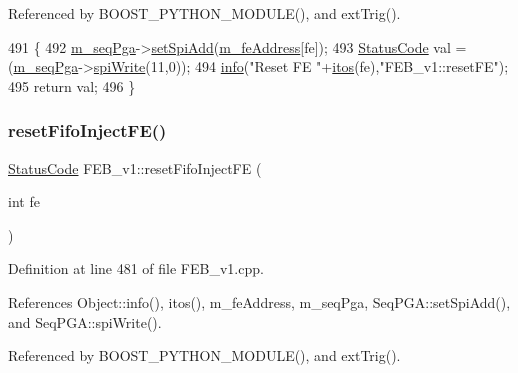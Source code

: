 Referenced by B\+O\+O\+S\+T\+\_\+\+P\+Y\+T\+H\+O\+N\+\_\+\+M\+O\+D\+U\+L\+E(), and ext\+Trig().


\begin{DoxyCode}
491                                 \{  
492   \hyperlink{classFEB__v1_a6c7804ac86796f233a8393043adf2e77}{m\_seqPga}->\hyperlink{classSeqPGA_ac998ce3a6d9b5f2e88cc8393f8c1df53}{setSpiAdd}(\hyperlink{classFEB__v1_a4e1945c2d5b434125f375e9d0fc6d99f}{m\_feAddress}[fe]);
493   \hyperlink{classStatusCode}{StatusCode} val = (\hyperlink{classFEB__v1_a6c7804ac86796f233a8393043adf2e77}{m\_seqPga}->\hyperlink{classSeqPGA_ad4421841ce4ce8b88ad13f63216f0743}{spiWrite}(11,0));
494   \hyperlink{classObject_a644fd329ea4cb85f54fa6846484b84a8}{info}(\textcolor{stringliteral}{"Reset FE "}+\hyperlink{Tools_8h_af330027dbdafb9a30768b3613c553e60}{itos}(fe),\textcolor{stringliteral}{"FEB\_v1::resetFE"});
495   \textcolor{keywordflow}{return} val;
496 \}
\end{DoxyCode}
\mbox{\label{classFEB__v1_a71d10a772bda2506fd7adb86739fb24d}} 
\subsubsection{\texorpdfstring{reset\+Fifo\+Inject\+F\+E()}{resetFifoInjectFE()}}
{\footnotesize\ttfamily \hyperlink{classStatusCode}{Status\+Code} F\+E\+B\+\_\+v1\+::reset\+Fifo\+Inject\+FE (\begin{DoxyParamCaption}\item[{int}]{fe }\end{DoxyParamCaption})}



Definition at line 481 of file F\+E\+B\+\_\+v1.\+cpp.



References Object\+::info(), itos(), m\+\_\+fe\+Address, m\+\_\+seq\+Pga, Seq\+P\+G\+A\+::set\+Spi\+Add(), and Seq\+P\+G\+A\+::spi\+Write().



Referenced by B\+O\+O\+S\+T\+\_\+\+P\+Y\+T\+H\+O\+N\+\_\+\+M\+O\+D\+U\+L\+E(), and ext\+Trig().


